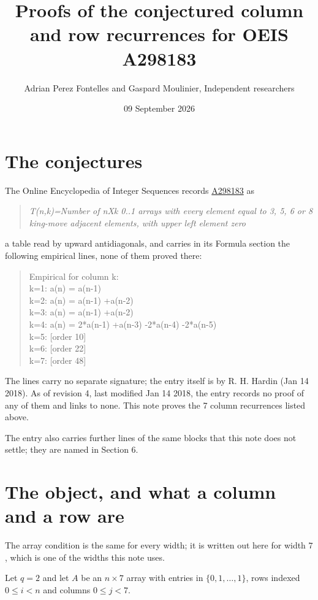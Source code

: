 \documentclass[11pt]{article}
\title{Proofs of the conjectured column and row recurrences for OEIS A298183}
\author{Adrian Perez Fontelles and Gaspard Moulinier, Independent researchers}
\date{09 September 2026}
\theoremstyle{definition}
\begin{document}
\maketitle
\section{The conjectures}

The Online Encyclopedia of Integer Sequences records \href{https://oeis.org/A298183}{A298183} as

\begin{quote}\itshape T(n,k)=Number of nXk 0..1 arrays with every element equal to 3, 5, 6 or 8 king-move adjacent elements, with upper left element zero\end{quote}

a table read by upward antidiagonals, and carries in its Formula section the following empirical lines, none of them proved there:

\begin{quote}\ttfamily Empirical for column k:\\
k=1: a(n) = a(n-1)\\k=2: a(n) = a(n-1) +a(n-2)\\k=3: a(n) = a(n-1) +a(n-2)\\k=4: a(n) = 2*a(n-1) +a(n-3) -2*a(n-4) -2*a(n-5)\\k=5: [order 10]\\k=6: [order 22]\\k=7: [order 48]\end{quote}

The lines carry no separate signature; the entry itself is by R. H. Hardin (Jan 14 2018). As of revision 4, last modified Jan 14 2018, the entry records no proof of any of them and links to none. This note proves the 7 column recurrences listed above.

The entry also carries further lines of the same blocks that this note does not settle; they are named in Section 6.

\section{The object, and what a column and a row are}

The array condition is the same for every width; it is written out here for width $7$, which is one of the widths this note uses.

Let $q = 2$ and let $A$ be an $n \times 7$ array with entries in $\{0,1,\dots,1\}$, rows indexed $0 \le i < n$ and columns $0 \le j < 7$.
\end{document}
